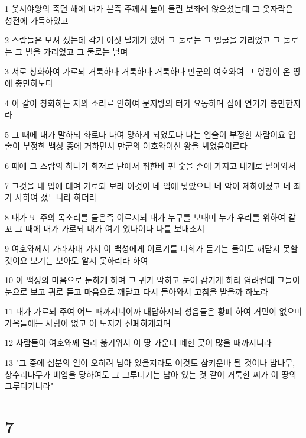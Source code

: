 \par 1 웃시야왕의 죽던 해에 내가 본즉 주께서 높이 들린 보좌에 앉으셨는데 그 옷자락은 성전에 가득하였고
\par 2 스랍들은 모셔 섰는데 각기 여섯 날개가 있어 그 둘로는 그 얼굴을 가리었고 그 둘로는 그 발을 가리었고 그 둘로는 날며
\par 3 서로 창화하여 가로되 거룩하다 거룩하다 거룩하다 만군의 여호와여 그 영광이 온 땅에 충만하도다
\par 4 이 같이 창화하는 자의 소리로 인하여 문지방의 터가 요동하며 집에 연기가 충만한지라
\par 5 그 때에 내가 말하되 화로다 나여 망하게 되었도다 나는 입술이 부정한 사람이요 입술이 부정한 백성 중에 거하면서 만군의 여호와이신 왕을 뵈었음이로다
\par 6 때에 그 스랍의 하나가 화저로 단에서 취한바 핀 숯을 손에 가지고 내게로 날아와서
\par 7 그것을 내 입에 대며 가로되 보라 이것이 네 입에 닿았으니 네 악이 제하여졌고 네 죄가 사하여 졌느니라 하더라
\par 8 내가 또 주의 목소리를 들은즉 이르시되 내가 누구를 보내며 누가 우리를 위하여 갈꼬 그 때에 내가 가로되 내가 여기 있나이다 나를 보내소서
\par 9 여호와께서 가라사대 가서 이 백성에게 이르기를 너희가 듣기는 들어도 깨닫지 못할 것이요 보기는 보아도 알지 못하리라 하여
\par 10 이 백성의 마음으로 둔하게 하며 그 귀가 막히고 눈이 감기게 하라 염려컨대 그들이 눈으로 보고 귀로 듣고 마음으로 깨닫고 다시 돌아와서 고침을 받을까 하노라
\par 11 내가 가로되 주여 어느 때까지니이까 대답하시되 성읍들은 황폐 하여 거민이 없으며 가옥들에는 사람이 없고 이 토지가 전폐하게되며
\par 12 사람들이 여호와께 멀리 옮기워서 이 땅 가운데 폐한 곳이 많을 때까지니라
\par 13 "그 중에 십분의 일이 오히려 남아 있을지라도 이것도 삼키운바 될 것이나 밤나무, 상수리나무가 베임을 당하여도 그 그루터기는 남아 있는 것 같이 거룩한 씨가 이 땅의 그루터기니라"

\chapter{7}

